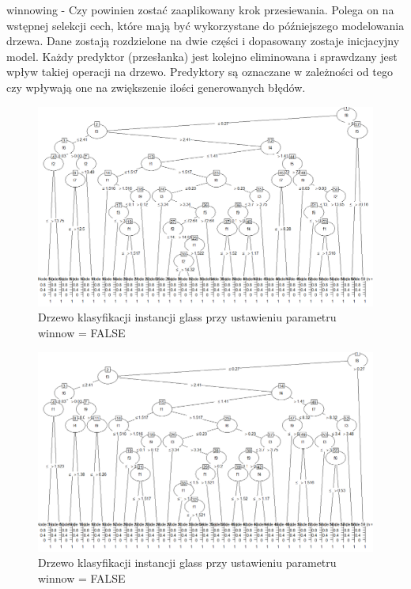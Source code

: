 \documentclass[12pt,a4paper]{article}
\begin{document}
winnowing - Czy powinien zostać zaaplikowany krok przesiewania. Polega on na wstępnej selekcji cech, które mają być wykorzystane do późniejszego modelowania drzewa. Dane zostają rozdzielone na dwie części i dopasowany zostaje inicjacyjny model. Każdy predyktor (przesłanka) jest kolejno eliminowana i sprawdzany jest wpływ takiej operacji na drzewo. Predyktory są oznaczane w zależności od tego czy wpływają one na zwiększenie ilości generowanych błędów.

\begin{figure}[H]
\centering
\includegraphics[width=1\textwidth]{glassWinnow_FALSE.png}
\caption{Drzewo klasyfikacji instancji glass przy ustawieniu parametru winnow = FALSE}
\end{figure}

\begin{figure}[H]
\centering
\includegraphics[width=1\textwidth]{glassWinnow_TRUE.png}
\caption{Drzewo klasyfikacji instancji glass przy ustawieniu parametru winnow = FALSE}
\end{figure}
\end{document}
